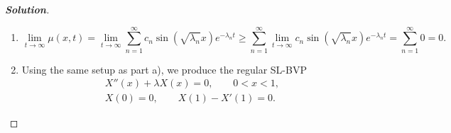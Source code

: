 \documentclass[letterpaper,11pt]{article} %
\theoremstyle{plain}
\begin{document}
\begin{proof}[\textbf{Solution}]
\begin{enumerate}[label=\alph*.)]
        The formal solution to the given heat problem can therefore be expressed as
        \begin{equation*}
        \mu(x, t) = \sum_{n=1}^\infty c_n \sin(\sqrt{\lambda_n}x) e^{-\lambda_n t}.
        \end{equation*}
        Since $\mu(x, 0) = f(x) = 75$,
        \begin{align*}
            \mu(x, 0) = \sum_{n=1}^\infty c_n \sin(\sqrt{\lambda_n}x) &= f(x) = 75
            \shortintertext{so}
            c_n = \frac{\displaystyle \int_0^1 f(x) X_n(x)\,\mathrm{d}x}{\displaystyle\int_0^1 X^2_n(x)\,\mathrm{d}x} &= \frac{\displaystyle 75\int_0^1  \sin(\sqrt{\lambda_n}x)\,\mathrm{d}x}{\displaystyle\int_0^1 \sin^2(\sqrt{\lambda_n}x)\,\mathrm{d}x} = \frac{\displaystyle \frac{75}{\sqrt{\lambda_n}}\left.\cos(\sqrt{\lambda_n}x)\right|_0^1}{\displaystyle \int_0^1 \left(\frac{1}{2} - \frac{1}{2} \cos(2\sqrt{\lambda_n}x)\right)\,\mathrm{d}x} \\
            &= \frac{\displaystyle \frac{75}{\sqrt{\lambda_n}}\left(\cos(\sqrt{\lambda_n} )- 1\right)}{\displaystyle \frac{1}{2} - \frac{1}{4\sqrt{\lambda_n}}\left.\sin(2\sqrt{\lambda_n}x)\right|_0^1 } = \frac{\displaystyle \frac{75}{\sqrt{\lambda_n}}\left(\cos(\sqrt{\lambda_n} )- 1\right)}{\displaystyle \frac{1}{2} - \frac{1}{4\sqrt{\lambda_n}}\sin(2\sqrt{\lambda_n})}
        \end{align*}
        The complete solution is therefore
        \begin{equation*}
         \boxed{\mu(x, t) = \sum_{n=1}^\infty \left(\frac{\displaystyle 75\left(\cos(\sqrt{\lambda_n} )- 1\right)}{\displaystyle \frac{\sqrt{\lambda_n}}{2} - \frac{1}{4}\sin(2\sqrt{\lambda_n})} \right)\sin(\sqrt{\lambda_n}x) e^{-\lambda_n t}}.
        \end{equation*}
        where the eigenvalues $\lambda_n$ satisfy the transcendental equation $\tan(\sqrt{\lambda_n}) = -\sqrt{\lambda_n}$.
        
        \item \begin{equation*}
        \lim\limits_{t \to \infty} \mu(x, t) =  \lim\limits_{t \to \infty}\sum_{n=1}^\infty c_n \sin(\sqrt{\lambda_n}x) e^{-\lambda_n t} \geq \sum_{n=1}^\infty \lim\limits_{t \to \infty} c_n \sin(\sqrt{\lambda_n}x) e^{-\lambda_n t} = \sum_{n=1}^\infty 0 = 0.
        \end{equation*}
        
        \item Using the same setup as part a), we produce the regular SL-BVP
        \begin{gather*}
            X''(x) + \lambda X(x) = 0, \qquad 0 < x < 1, \\
            X(0) = 0, \qquad X(1) - X'(1) = 0.
        \end{gather*}
        
        
    \end{enumerate}
\end{proof}
\end{document}
